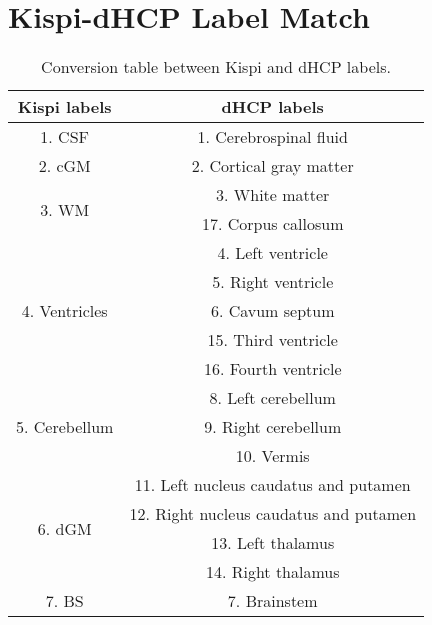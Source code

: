 
\renewcommand\thetable{B.\arabic{table}}
\setcounter{table}{0}
 \label{app:SupplementaryTables}
\vspace{1cm}

\section{Kispi-dHCP Label Match}
\begin{table}[htbp]
    \centering
    \begin{tabular}{c|c}
        \toprule
        \textbf{Kispi labels} & \textbf{dHCP labels} \\
        \midrule
        1. CSF & 1. Cerebrospinal fluid \\ \hline
        2. cGM & 2. Cortical gray matter \\ \hline
        \multirow{2}{*}{3. WM} & 3. White matter \\
         & 17. Corpus callosum \\ \hline
        \multirow{5}{*}{4. Ventricles} & 4. Left ventricle \\
         & 5. Right ventricle \\
         & 6. Cavum septum \\
         & 15. Third ventricle \\
         & 16. Fourth ventricle \\ \hline
        \multirow{3}{*}{5. Cerebellum} & 8. Left cerebellum \\
         & 9. Right cerebellum \\
         & 10. Vermis \\ \hline
        \multirow{4}{*}{6. dGM} & 11. Left nucleus caudatus and putamen \\
         & 12. Right nucleus caudatus and putamen \\
         & 13. Left thalamus \\
         & 14. Right thalamus \\ \hline
        7. BS & 7. Brainstem \\
        \bottomrule
    \end{tabular}
    \caption{Conversion table between Kispi and dHCP labels.}
    \label{tab:label_merge}
\end{table}

